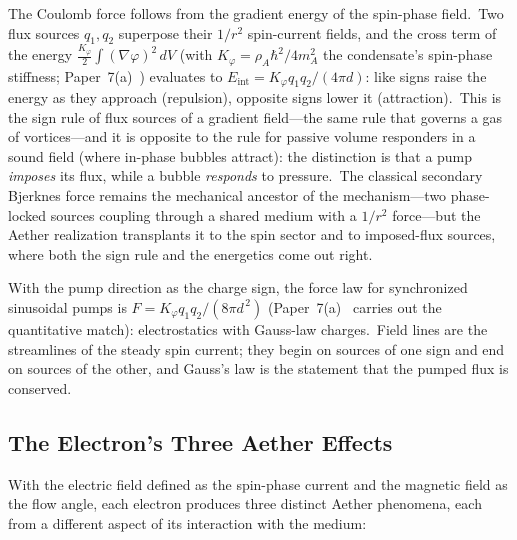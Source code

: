 ﻿\documentclass[12pt,letterpaper]{article}
\newcommand{\rhoa}{\rho_{\!A}}
\begin{document}
The Coulomb force follows from the gradient energy of the spin-phase
field.\ Two flux sources $q_1, q_2$ superpose their $1/r^2$ spin-current
fields, and the cross term of the energy
$\tfrac{K_\varphi}{2}\!\int\!(\nabla\varphi)^2\,dV$ (with
$K_\varphi = \rhoa\hbar^2/4m_A^2$ the condensate's spin-phase stiffness;
Paper~7(a)~\cite{otto-boundcore}) evaluates to
$E_{\mathrm{int}} = K_\varphi q_1 q_2/(4\pi d)$: like signs raise the energy
as they approach (repulsion), opposite signs lower it (attraction).\ This is
the sign rule of flux sources of a gradient field---the same rule that
governs a gas of vortices---and it is opposite to the rule for passive
volume responders in a sound field (where in-phase bubbles attract): the
distinction is that a pump \emph{imposes} its flux, while a bubble
\emph{responds} to pressure.\ The classical secondary Bjerknes force
\cite{bjerknes1906} remains the mechanical ancestor of the mechanism---two
phase-locked sources coupling through a shared medium with a $1/r^2$
force---but the Aether realization transplants it to the spin sector and to
imposed-flux sources, where both the sign rule and the energetics come out
right.

With the pump direction as the charge sign, the force law for synchronized
sinusoidal pumps is $F = K_\varphi q_1 q_2/(8\pi d^{\,2})$
(Paper~7(a)~\cite{otto-boundcore} carries out the quantitative match):
electrostatics with Gauss-law charges.\ Field lines are the streamlines of
the steady spin current; they begin on sources of one sign and end on
sources of the other, and Gauss's law is the statement that the pumped flux
is conserved.


\subsection{The Electron's Three Aether Effects}
\label{sec:three-effects}

With the electric field defined as the spin-phase current and the magnetic
field as the flow angle, each electron produces three distinct Aether
phenomena, each from a different aspect of its interaction with the medium:
\end{document}
